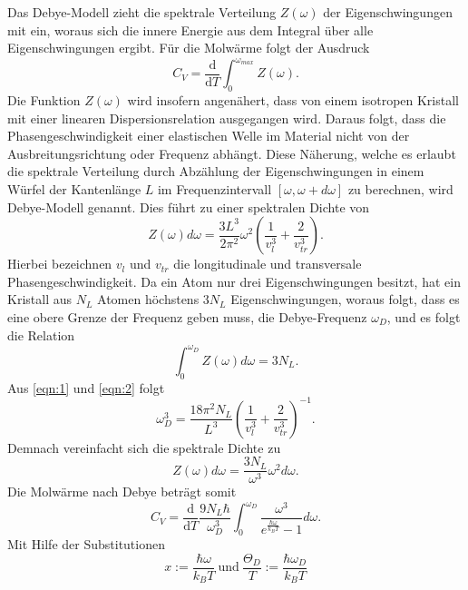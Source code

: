 Das Debye-Modell zieht die spektrale Verteilung $Z(\omega)$ der Eigenschwingungen mit ein, woraus sich die innere Energie aus dem Integral über alle Eigenschwingungen ergibt.
Für die Molwärme folgt der Ausdruck
\begin{equation}
  C_V = \frac{\mathrm{d}}{\mathrm{d}T}\int_{0}^{\omega_{max}}Z(\omega).
\end{equation}
Die Funktion $Z(\omega)$ wird insofern angenähert, dass von einem isotropen Kristall mit einer linearen Dispersionsrelation ausgegangen wird.
Daraus folgt, dass die Phasengeschwindigkeit einer elastischen Welle im Material nicht von der Ausbreitungsrichtung oder Frequenz abhängt.
Diese Näherung, welche es erlaubt die spektrale Verteilung durch Abzählung der Eigenschwingungen in einem Würfel der Kantenlänge $L$ im Frequenzintervall $[\omega,\omega+d\omega]$ zu berechnen, wird Debye-Modell genannt.
Dies führt zu einer spektralen Dichte von
\begin{equation}
  Z(\omega)d\omega = \frac{3L^3}{2\pi^2}\omega^2\left(\frac{1}{v_l^3}+\frac{2}{v_{tr}^3}\right). \label{eqn:1}
\end{equation}
Hierbei bezeichnen $v_l$ und $v_{tr}$ die longitudinale und transversale Phasengeschwindigkeit.
Da ein Atom nur drei Eigenschwingungen besitzt, hat ein Kristall aus $N_L$ Atomen höchstens $3N_L$ Eigenschwingungen, woraus folgt, dass es eine obere Grenze der Frequenz geben muss, die Debye-Frequenz $\omega_D$, und es folgt die Relation
\begin{equation}
  \int_{0}^{\omega_D}Z(\omega)d\omega = 3N_L. \label{eqn:2}
\end{equation}
Aus \eqref{eqn:1} und \eqref{eqn:2} folgt
\begin{equation}
  \omega_D^3 = \frac{18\pi^2N_L}{L^3}\left(\frac{1}{v_l^3}+\frac{2}{v_{tr}^3} \right)^{-1}. \label{eqn:3}
\end{equation}
Demnach vereinfacht sich die spektrale Dichte zu
\begin{equation}
  Z(\omega)d\omega = \frac{3N_L}{\omega^3}\omega^2d\omega.
\end{equation}
Die Molwärme nach Debye beträgt somit
\begin{equation}
  C_V = \frac{\mathrm{d}}{\mathrm{d}T}\frac{9N_L\hbar}{\omega_D^3} \int_{0}^{\omega_D}\frac{\omega^3}{e^{\frac{\hbar\omega}{k_BT}}-1}d\omega.
\end{equation}
Mit Hilfe der Substitutionen
\begin{equation}
  x := \frac{\hbar\omega}{k_BT} \: \text{und} \: \frac{\Theta_D}{T} := \frac{\hbar\omega_D}{k_BT} \label{eqn:4}
\end{equation}

